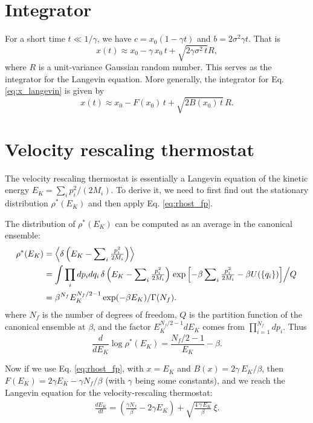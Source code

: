 \documentclass[11pt]{article}
\begin{document}
\section{\label{sec:int0}Integrator}



For a short time $t \ll 1/\gamma$,
we have $c = x_0 (1 - \gamma t)$
and $b = 2 \sigma^2 \gamma t$.
That is
\[
  x(t)
\approx
  x_0 - \gamma \, x_0 \, t
  + \sqrt{ 2 \gamma \sigma^2 \, t } R,
\]
where $R$ is a unit-variance Gaussian random number.
%
This serves as the integrator for the Langevin equation.
%
More generally, the integrator for Eq. \eqref{eq:x_langevin}
is given by
\begin{equation}
  x(t)
\approx
  x_0 - F(x_0) \, t
  + \sqrt{ 2 B(x_0) \, t } \, R.
  \label{eq:langevin_int0}
\end{equation}



\section{\label{sec:tstat1}Velocity rescaling thermostat}



The velocity rescaling thermostat is essentially
a Langevin equation of the kinetic energy
$E_K = \sum_i p_i^2 / (2 M_i)$.
%
To derive it,
we need to first find out the stationary distribution $\rho^*(E_K)$
and then apply Eq. \eqref{eq:rhost_fp}.

The distribution of $\rho^*(E_K)$ can be computed as
an average in the canonical ensemble:
\begin{align}
\rho^*(E_K)
&=
\left\langle
  \delta\left( E_K - \sum\nolimits_i \tfrac{ p_i^2 }{ 2 M_i } \right)
\right\rangle
\notag \\
&=
\int \prod\limits_i d p_i d q_i \,
\delta\left( E_K - \sum\nolimits_i \tfrac{ p_i^2 }{ 2 M_i } \right)
\left.
\exp\left[
    - \beta \sum\nolimits_i \tfrac{ p_i^2 }{ 2 M_i }
    - \beta U(\{q_i\})
\right] \middle/Q \right.
\notag \\
&=
\beta^{N_f} E_K^{N_f/2 - 1} \exp(-\beta E_K) / \Gamma(N_f).
\label{eq:rhost_EK}
\end{align}
%
where $N_f$ is the number of degrees of freedom,
$Q$ is the partition function of the canonical ensemble at $\beta$,
and the factor $E_K^{N_f/2 - 1} d E_K$ comes from $\prod_{i = 1}^{N_f} d p_i$.
%
Thus
\[
\frac d {d E_K} \log \rho^*(E_K)
=
\frac{ N_f/2 - 1 } { E_K } - \beta.
\]


Now if we use Eq. \eqref{eq:rhost_fp},
with $x = E_K$ and $B(x) = 2 \gamma \, E_K/\beta$,
then $F(E_K) = 2 \gamma E_K - \gamma N_f/\beta$
(with $\gamma$ being some constants),
and we reach the Langevin equation
for the velocity-rescaling thermostat:
\begin{align}
\frac { d E_K } { d t }
=
\left( \frac{ \gamma N_f }{ \beta } - 2 \gamma E_K \right)
+ \sqrt{ \frac{ 4 \, \gamma \, E_K } { \beta } } \, \xi.
\label{eq:vrescale}
\end{align}
\end{document}
